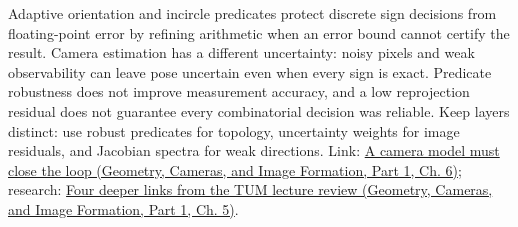 Adaptive orientation and incircle predicates protect discrete sign decisions from floating-point error by refining arithmetic when an error bound cannot certify the result. Camera estimation has a different uncertainty: noisy pixels and weak observability can leave pose uncertain even when every sign is exact. Predicate robustness does not improve measurement accuracy, and a low reprojection residual does not guarantee every combinatorial decision was reliable. Keep layers distinct: use robust predicates for topology, uncertainty weights for image residuals, and Jacobian spectra for weak directions. Link: \href{../03-Geometry-Cameras-and-Image-Formation-P01/main.pdf\#02-foundations-ii-ch037-a-camera-model-must-close-the-loop}{A camera model must close the loop (Geometry, Cameras, and Image Formation, Part 1, Ch. 6)}; research: \href{../03-Geometry-Cameras-and-Image-Formation-P01/main.pdf\#02-foundations-ii-ch036-four-deeper-links-from-the-tum-lecture-review}{Four deeper links from the TUM lecture review (Geometry, Cameras, and Image Formation, Part 1, Ch. 5)}.

